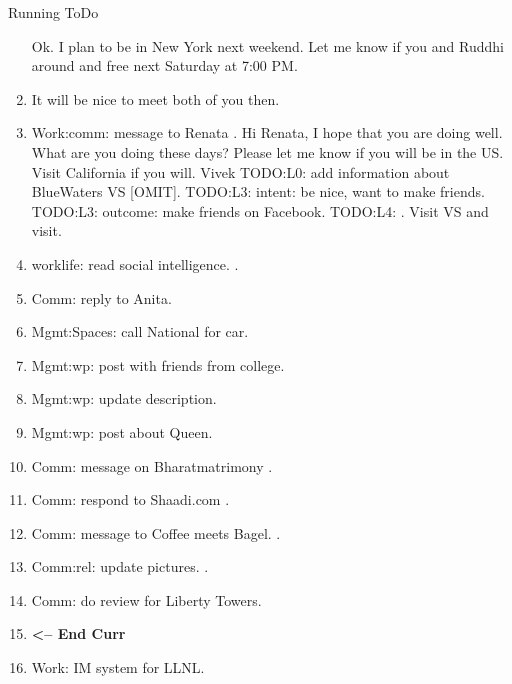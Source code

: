 \begin{columns}
\begin{column}{0.6\linewidth}
\begin{block}{Running ToDo}
\begin{enumerate}
          Ok. I plan to be in New York next weekend. Let me know if you and
          Ruddhi around and free next Saturday at 7:00 PM.  
          
        \item \tiny It will be nice to meet both of you then. 

        \item \tiny Work:comm: message to Renata . 
          Hi Renata,
          I hope that you are doing well. What are you doing these days? Please let me know if you will be in the US. Visit California if you will. 
          Vivek
          TODO:L0: add information about BlueWaters VS [OMIT]. 
          TODO:L3: intent: be nice, want to make friends.
          TODO:L3: outcome: make friends on Facebook. 
          TODO:L4: . Visit VS and visit.
          
      \item \tiny worklife: read social intelligence. . 
      \item \tiny Comm: reply to Anita. 
        
      \item \tiny Mgmt:Spaces: call National for car. 
        
      \item \tiny Mgmt:wp: post with friends from college.
        
      \item \tiny Mgmt:wp: update description. 
      \item \tiny Mgmt:wp: post about Queen.             
        
      \item \tiny Comm: message on Bharatmatrimony .       
      \item \tiny Comm: respond to Shaadi.com .
      \item \tiny Comm: message to Coffee meets Bagel. . 
        
      \item \tiny Comm:rel: update pictures. .
      \item \tiny Comm: do review for Liberty Towers. 
        
      \item \tiny \textbf{ <-- End Curr } 
        
      \item \tiny Work: IM system for LLNL.
        \end{enumerate}
      \end{block}
      

\end{column}
\end{columns}
